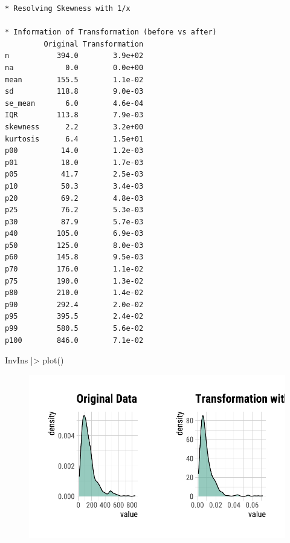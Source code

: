\documentclass[
  letterpaper,
  DIV=11,
  numbers=noendperiod]{scrreprt}
\newenvironment{Shaded}{\begin{snugshade}}{\end{snugshade}}
\newcommand{\FunctionTok}[1]{\textcolor[rgb]{0.28,0.35,0.67}{#1}}
\newcommand{\NormalTok}[1]{\textcolor[rgb]{0.00,0.23,0.31}{#1}}
\newcommand{\SpecialCharTok}[1]{\textcolor[rgb]{0.37,0.37,0.37}{#1}}
\begin{document}
\begin{verbatim}
* Resolving Skewness with 1/x

* Information of Transformation (before vs after)
         Original Transformation
n           394.0        3.9e+02
na            0.0        0.0e+00
mean        155.5        1.1e-02
sd          118.8        9.0e-03
se_mean       6.0        4.6e-04
IQR         113.8        7.9e-03
skewness      2.2        3.2e+00
kurtosis      6.4        1.5e+01
p00          14.0        1.2e-03
p01          18.0        1.7e-03
p05          41.7        2.5e-03
p10          50.3        3.4e-03
p20          69.2        4.8e-03
p25          76.2        5.3e-03
p30          87.9        5.7e-03
p40         105.0        6.9e-03
p50         125.0        8.0e-03
p60         145.8        9.5e-03
p70         176.0        1.1e-02
p75         190.0        1.3e-02
p80         210.0        1.4e-02
p90         292.4        2.0e-02
p95         395.5        2.4e-02
p99         580.5        5.6e-02
p100        846.0        7.1e-02
\end{verbatim}

\begin{Shaded}
\begin{Highlighting}[]
\NormalTok{InvIns }\SpecialCharTok{|\textgreater{}}
  \FunctionTok{plot}\NormalTok{()}
\end{Highlighting}
\end{Shaded}

\begin{figure}[H]

{\centering \includegraphics{./TransformingLikeDataTrans_files/figure-pdf/unnamed-chunk-13-1.pdf}

}

\end{figure}
\end{document}

